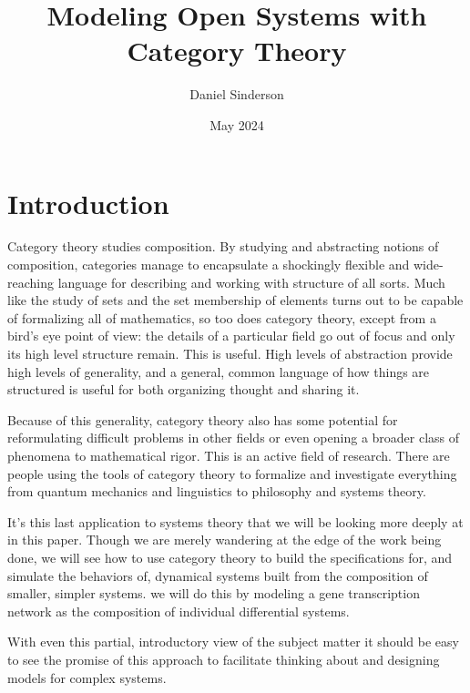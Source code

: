 \documentclass[12pt]{article}
\title{Modeling Open Systems with Category Theory}
\author{Daniel Sinderson}
\date{May 2024}
\begin{document}
\maketitle


\section*{Introduction}
Category theory studies composition.
By studying and abstracting notions of composition, categories manage to encapsulate
a shockingly flexible and wide-reaching language for describing and working with structure of all sorts.
Much like the study of sets and the set membership of elements turns out to be capable of formalizing all of mathematics,
so too does category theory, except from a bird's eye point of view:
the details of a particular field go out of focus and only its high level structure remain.
This is useful.
High levels of abstraction provide high levels of generality,
and a general, common language of how things are structured is useful for both organizing thought and sharing it.

Because of this generality, category theory also has some potential for
reformulating difficult problems in other fields or even
opening a broader class of phenomena to mathematical rigor.
This is an active field of research.
There are people using the tools of category theory to formalize and investigate everything from quantum mechanics and linguistics to philosophy and systems theory.

It's this last application to systems theory that we will be looking more deeply at in this paper.
Though we are merely wandering at the edge of the work being done, we will see how to use category theory to build the specifications for, and simulate the behaviors of, dynamical systems built from the composition of smaller, simpler systems.
we will do this by modeling a gene transcription network as the composition of individual differential systems.

With even this partial, introductory view of the subject matter
it should be easy to see the promise of this approach to facilitate thinking about
and designing models for complex systems.






\end{document}
